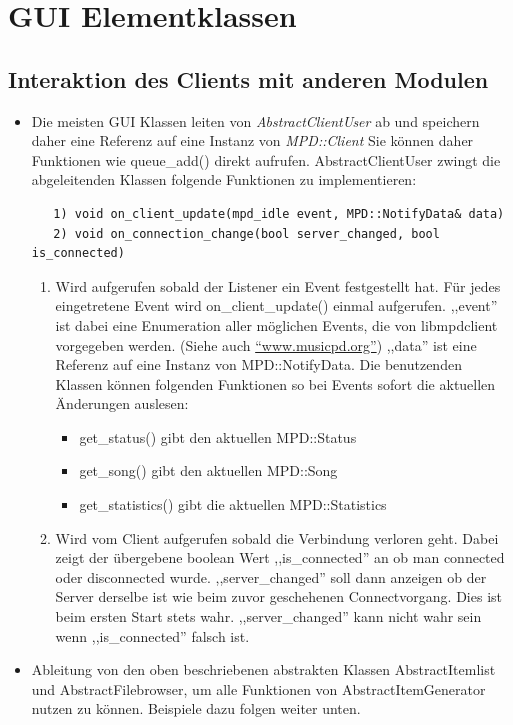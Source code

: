 \newpage
\section{GUI Elementklassen}
\subsection{Interaktion des Clients mit anderen Modulen}
\begin{itemize}
\item Die meisten GUI Klassen leiten von \emph{AbstractClientUser} ab und speichern daher eine Referenz auf eine Instanz von \emph{MPD::Client}
      Sie können daher Funktionen wie queue\_add() direkt aufrufen.
      AbstractClientUser zwingt die abgeleitenden Klassen folgende Funktionen zu implementieren: 
\begin{verbatim} 
   1) void on_client_update(mpd_idle event, MPD::NotifyData& data)
   2) void on_connection_change(bool server_changed, bool is_connected)
\end{verbatim}
   \begin{enumerate}
   \item Wird aufgerufen sobald der Listener ein Event festgestellt hat. Für jedes eingetretene Event wird on\_client\_update()    
   einmal aufgerufen. ,,event'' ist dabei eine Enumeration aller möglichen Events, die von libmpdclient 
   vorgegeben werden. (Siehe auch \href{``http://www.musicpd.org/doc/libmpdclient/idle\_8h.html#a3378f7a24c714d7cb1058232330d7a1c''}{``www.musicpd.org''})
   ,,data'' ist eine Referenz auf eine Instanz von MPD::NotifyData. Die benutzenden Klassen können folgenden Funktionen so
   bei Events sofort die aktuellen Änderungen auslesen:
   \begin{itemize} 
     \item get\_status() gibt den aktuellen MPD::Status
     \item get\_song() gibt den aktuellen MPD::Song
     \item get\_statistics() gibt die aktuellen MPD::Statistics
   \end{itemize} 
   \item Wird vom Client aufgerufen sobald die Verbindung verloren geht.
         Dabei zeigt der übergebene boolean Wert ,,is\_connected'' an ob man connected oder disconnected wurde.
         ,,server\_changed'' soll dann anzeigen ob der Server derselbe ist wie beim zuvor geschehenen Connectvorgang.
         Dies ist beim ersten Start stets wahr. ,,server\_changed'' kann nicht wahr sein wenn ,,is\_connected'' falsch ist.
   \end{enumerate}
\item Ableitung von den oben beschriebenen abstrakten Klassen AbstractItemlist und AbstractFilebrowser, um alle Funktionen von AbstractItemGenerator nutzen zu können. Beispiele dazu folgen weiter unten.
\end{itemize}

